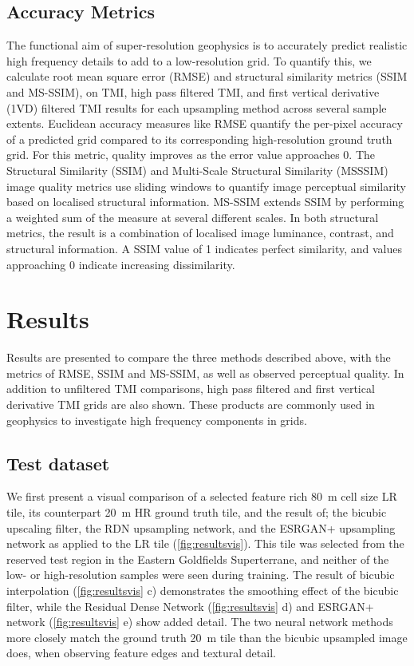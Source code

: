 \documentclass[manuscript.tex]{subfiles}
\begin{document}
\subsection{Accuracy Metrics}
The functional aim of super-resolution geophysics is to accurately predict realistic high frequency details to add to a low-resolution grid.
To quantify this, we calculate root mean square error (RMSE) and structural similarity metrics (SSIM and MS-SSIM), on TMI, high pass filtered TMI, and first vertical derivative (1VD) filtered TMI results for each upsampling method across several sample extents.
Euclidean accuracy measures like RMSE quantify the per-pixel accuracy of a predicted grid compared to its corresponding high-resolution ground truth grid.
For this metric, quality improves as the error value approaches \num{0}.
The Structural Similarity (SSIM) \parencite{wangImageQualityAssessment2004} and Multi-Scale Structural Similarity (MSSSIM) \parencite{wangMultiscaleStructuralSimilarity2003} image quality metrics use sliding windows to quantify image perceptual similarity based on localised structural information.
MS-SSIM extends SSIM by performing a weighted sum of the measure at several different scales.
In both structural metrics, the result is a combination of localised image luminance, contrast, and structural information.
A SSIM value of 1 indicates perfect similarity, and values approaching \num{0} indicate increasing dissimilarity.

\section{Results}
Results are presented to compare the three methods described above, with the metrics of RMSE, SSIM and MS-SSIM, as well as observed perceptual quality.
In addition to unfiltered TMI comparisons, high pass filtered and first vertical derivative TMI grids are also shown.
These products are commonly used in geophysics to investigate high frequency components in grids.

\subsection{Test dataset}
We first present a visual comparison of a selected feature rich \SI{80}{\metre} cell size LR tile, its counterpart \SI{20}{\metre} HR ground truth tile, and the result of; the bicubic upscaling filter, the RDN\textdaggerdbl{} upsampling network, and the ESRGAN+ upsampling network as applied to the LR tile (\cref{fig:resultsvis}).
This tile was selected from the reserved test region in the Eastern Goldfields Superterrane, and neither of the low- or high-resolution samples were seen during training.
The result of bicubic interpolation (\cref{fig:resultsvis} c) demonstrates the smoothing effect of the bicubic filter, while the Residual Dense Network (\cref{fig:resultsvis} d) and ESRGAN+ network (\cref{fig:resultsvis} e) show added detail.
The two neural network methods more closely match the ground truth \SI{20}{\metre} tile than the bicubic upsampled image does, when observing feature edges and textural detail.
\end{document}
